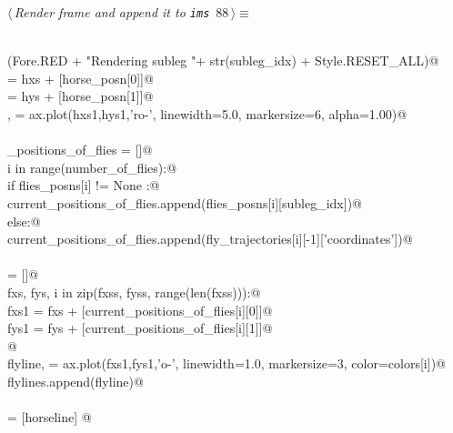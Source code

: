 \documentclass[11.5pt]{report}
\begin{document}
\vspace{-0.8cm} \newchunk
\begin{flushleft} \small
\begin{minipage}{\linewidth}\label{scrap139}\raggedright\small
{} $\langle\,${\itshape Render frame and append it to \verb|ims|}\nobreak\ {\footnotesize {88}}$\,\rangle\equiv$
\vspace{-1ex}
\begin{list}{}{} \item
\mbox{}\verb@@\\
\mbox{}\verb@debug(Fore.RED + "Rendering subleg "+ str(subleg_idx) + Style.RESET_ALL)@\\
\mbox{} = hxs + [horse_posn[0]]@\\
\mbox{} = hys + [horse_posn[1]]@\\
\mbox{}\verb@horseline, = ax.plot(hxs1,hys1,'ro-', linewidth=5.0, markersize=6, alpha=1.00)@\\
\mbox{}\verb@@\\
\mbox{}\verb@current_positions_of_flies = []@\\
\mbox{}\verb@for i in range(number_of_flies):@\\
\mbox{}\verb@    if flies_posns[i] != None :@\\
\mbox{}\verb@        current_positions_of_flies.append(flies_posns[i][subleg_idx])@\\
\mbox{}\verb@    else:@\\
\mbox{}\verb@        current_positions_of_flies.append(fly_trajectories[i][-1]['coordinates'])@\\
\mbox{}\verb@@\\
\mbox{}\verb@flylines = []@\\
\mbox{}\verb@for fxs, fys, i in zip(fxss, fyss, range(len(fxss))):@\\
\mbox{}\verb@    fxs1 = fxs + [current_positions_of_flies[i][0]]@\\
\mbox{}\verb@    fys1 = fys + [current_positions_of_flies[i][1]]@\\
\mbox{}\verb@    @\\
\mbox{}\verb@    flyline, = ax.plot(fxs1,fys1,'o-', linewidth=1.0, markersize=3, color=colors[i])@\\
\mbox{}\verb@    flylines.append(flyline)@\\
\mbox{}\verb@@\\
\mbox{}\verb@objs = [horseline] @\\
\mbox{}\verb@@\\

\end{list}
\end{minipage}
\end{flushleft}
\end{document}
